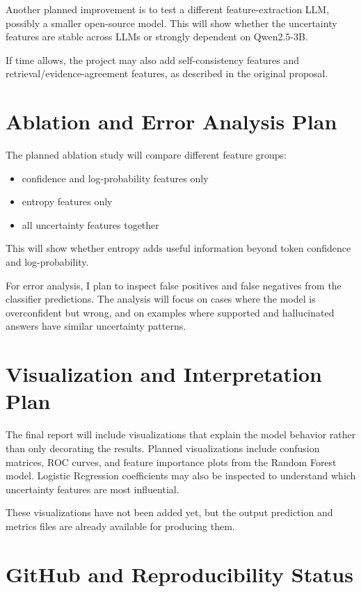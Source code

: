 \documentclass[11pt]{article}
\begin{document}
Another planned improvement is to test a different feature-extraction LLM, possibly a smaller open-source model. This will show whether the uncertainty features are stable across LLMs or strongly dependent on Qwen2.5-3B.

If time allows, the project may also add self-consistency features and retrieval/evidence-agreement features, as described in the original proposal.

\section{Ablation and Error Analysis Plan}

The planned ablation study will compare different feature groups:

\begin{itemize}
    \item confidence and log-probability features only
    \item entropy features only
    \item all uncertainty features together
\end{itemize}

This will show whether entropy adds useful information beyond token confidence and log-probability.

For error analysis, I plan to inspect false positives and false negatives from the classifier predictions. The analysis will focus on cases where the model is overconfident but wrong, and on examples where supported and hallucinated answers have similar uncertainty patterns.

\section{Visualization and Interpretation Plan}

The final report will include visualizations that explain the model behavior rather than only decorating the results. Planned visualizations include confusion matrices, ROC curves, and feature importance plots from the Random Forest model. Logistic Regression coefficients may also be inspected to understand which uncertainty features are most influential.

These visualizations have not been added yet, but the output prediction and metrics files are already available for producing them.

\section{GitHub and Reproducibility Status}
\end{document}
